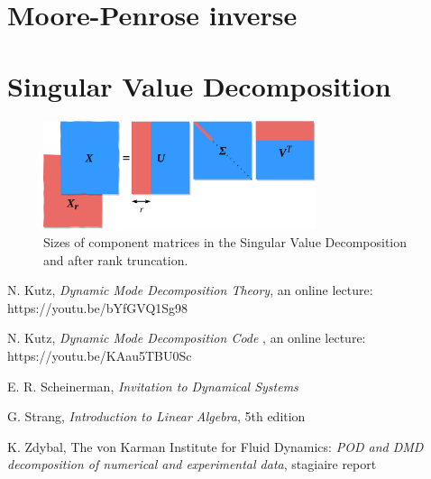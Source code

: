 \documentclass[10pt,twocolumn]{article}
\begin{document}
\section{Moore-Penrose inverse} \label{app:B}




\section{Singular Value Decomposition} \label{app:C}


\begin{figure}[H]
\centering\includegraphics[width=8cm]{svd.png}
\caption{Sizes of component matrices in the Singular Value Decomposition and after rank truncation.}
\label{fig:linear_system}
\end{figure}


\thebibliography{}

 N. Kutz, \textit{Dynamic Mode Decomposition Theory}, an online lecture: https://youtu.be/bYfGVQ1Sg98 \label{bib:kutz_1}

 N. Kutz, \textit{Dynamic Mode Decomposition Code }, an online lecture: https://youtu.be/KAau5TBU0Sc \label{bib:kutz_2}

 E. R. Scheinerman, \textit{Invitation to Dynamical Systems}

 G. Strang, \textit{Introduction to Linear Algebra}, 5th edition

\bibitem{} K. Zdybal, The von Karman Institute for Fluid Dynamics: \textit{POD and DMD decomposition of numerical and experimental data}, stagiaire report 
\end{document}
